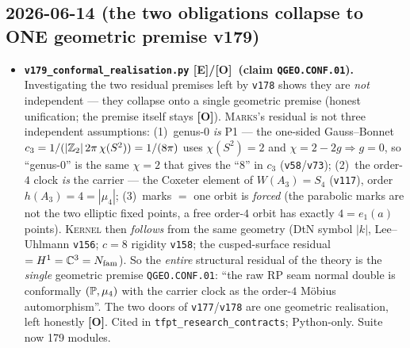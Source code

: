 \documentclass[11pt]{article}
\providecommand{\mE}{\textbf{[E]}}\providecommand{\mC}{\textbf{[C]}}
\providecommand{\mO}{\textbf{[O]}}\providecommand{\mX}{\textbf{[X]}}
\providecommand{\vref}[1]{\texttt{#1}}
\begin{document}
\subsection*{2026-06-14 (the two obligations collapse to ONE geometric premise v179)}
\begin{itemize}
\item \textbf{\texttt{v179\_conformal\_realisation.py} \mE/\mO\ (claim \texttt{QGEO.CONF.01}).}
  Investigating the two residual premises left by \vref{v178} shows they are \emph{not} independent ---
  they collapse onto a single geometric premise (honest unification; the premise itself stays \mO).
  \textsc{Marks}'s residual is not three independent assumptions: (1)~genus-$0$ \emph{is} P1 --- the
  one-sided Gauss--Bonnet $c_3=1/(|\mathbb{Z}_2|\,2\pi\,\chi(S^2))=1/(8\pi)$ uses $\chi(S^2)=2$ and
  $\chi=2-2g\Rightarrow g=0$, so ``genus-$0$'' is the same $\chi=2$ that gives the ``$8$'' in $c_3$
  (\vref{v58}/\vref{v73}); (2)~the order-$4$ clock \emph{is} the carrier --- the Coxeter element of
  $W(A_3)=S_4$ (\vref{v117}), order $h(A_3)=4=|\mu_4|$; (3)~marks $=$ one orbit is \emph{forced} (the
  parabolic marks are not the two elliptic fixed points, a free order-$4$ orbit has exactly $4=e_1(a)$
  points). \textsc{Kernel} then \emph{follows} from the same geometry (DtN symbol $|k|$, Lee--Uhlmann
  \vref{v156}; $c=8$ rigidity \vref{v158}; the cusped-surface residual $=H^1=\mathbb C^3=N_{\mathrm{fam}}$). So
  the \emph{entire} structural residual of the theory is the \emph{single} geometric premise
  \texttt{QGEO.CONF.01}: ``the raw RP seam normal double is conformally $(\mathbb{P},\mu_4)$ with the carrier
  clock as the order-$4$ M\"obius automorphism''. The two doors of \vref{v177}/\vref{v178} are one
  geometric realisation, left honestly \mO. Cited in \texttt{tfpt\_research\_contracts}; Python-only.
  Suite now 179 modules.
\end{itemize}
\end{document}

